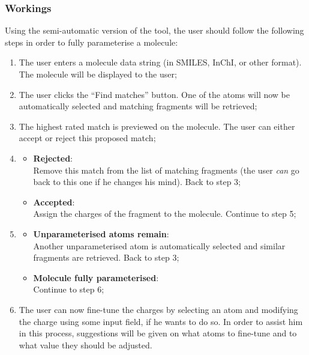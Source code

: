 \vspace{-.2cm}
\subsubsection{Workings}
\vspace{-.2cm}
Using the semi-automatic version of the tool, the user should follow the following steps in order to fully parameterise a molecule:
\begin{enumerate}[itemsep=.1em, parsep=.2em, topsep=0em]
\item The user enters a molecule data string (in SMILES, InChI, or other format). The molecule will be displayed to the user;
\item The user clicks the ``Find matches'' button. One of the atoms will now be automatically selected and matching fragments will be retrieved;
\item The highest rated match is previewed on the molecule. The user can either accept or reject this proposed match;
\item
\begin{itemize}[leftmargin=0cm, itemsep=.1em, parsep=.1em]
\item[]{\bf Rejected}:\\Remove this match from the list of matching fragments (the user \emph{can} go back to this one if he changes his mind). Back to step 3;
\item[] {\bf Accepted}:\\Assign the charges of the fragment to the molecule. Continue to step 5;
\end{itemize}
\item
\begin{itemize}[leftmargin=0cm, itemsep=.1em, parsep=.1em]
\item[]{\bf Unparameterised atoms remain}:\\Another unparameterised atom is automatically selected and similar fragments are retrieved. Back to step 3;
\item[] {\bf Molecule fully parameterised}:\\Continue to step 6;
\end{itemize}
\item The user can now fine-tune the charges by selecting an atom and modifying the charge using some input field, if he wants to do so. In order to assist him in this process, suggestions will be given on what atoms to fine-tune and to what value they should be adjusted.
\end{enumerate}

